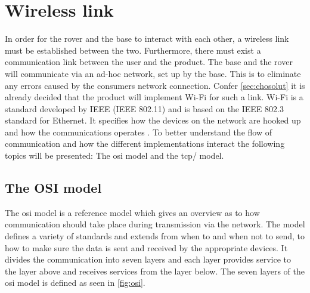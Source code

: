 \section{Wireless link}\graphicspath{{figures/design/basicsystem/}}

In order for the rover and the base to interact with each other, a wireless link must be established between the two. Furthermore, there must exist a communication link between the user and the product. The base and the rover will communicate via an ad-hoc network, set up by the base. This is to eliminate any errors caused by the consumers network connection. Confer \autoref{sec:chosolut} it is already decided that the product will implement Wi-Fi for such a link. Wi-Fi is a standard developed by IEEE (IEEE 802.11) and is based on the IEEE 802.3 standard for Ethernet. It specifies how the devices on the network are hooked up and how the communications operates \citep{Woodfi}. To better understand the flow of communication and how the different implementations interact the following topics will be presented: The \gls{osi} model and the \gls{tcp}/ model.

\subsection{The OSI model}
The \gls{osi} model is a reference model which gives an overview as to how communication should take place during transmission via the network. The model defines a variety of standards and extends from when to and when not to send, to how to make sure the data is sent and received by the appropriate devices. It divides the communication into seven layers and each layer provides service to the layer above and receives services from the layer below. The seven layers of the \gls{osi} model is defined as seen in \autoref{fig:osi}.

